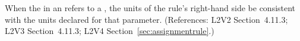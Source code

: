When the  in an \AssignmentRule refers to a \Parameter, the
units of the rule's right-hand side  be consistent with the units
declared for that parameter.  (References: L2V2 Section~4.11.3;
L2V3 Section~4.11.3; L2V4 Section~\ref{sec:assignmentrule}.)

